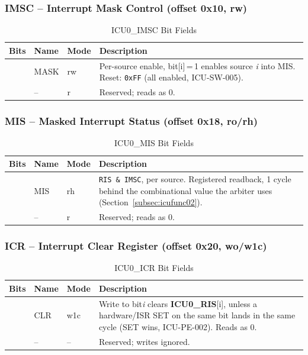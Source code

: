 \subsubsection{IMSC -- Interrupt Mask Control (offset 0x10, rw)}

\begin{table}[H]
\caption{ICU0\_IMSC Bit Fields}
\label{tab:asIcuIMSC}
\centering
\begin{tabularx}{\textwidth}{|l |l |l |X|}
  \hline
  Bits & Name & Mode & Description \\
  \hline
  \hline
  [7:0] & MASK & rw & Per-source enable, bit[i]\,=\,1 enables source \emph{i}
    into MIS. Reset: \texttt{0xFF} (all enabled, ICU-SW-005). \\
  \hline
  [63:8] & -- & r & Reserved; reads as 0. \\
  \hline
\end{tabularx}
\end{table}

\subsubsection{MIS -- Masked Interrupt Status (offset 0x18, ro/rh)}

\begin{table}[H]
\caption{ICU0\_MIS Bit Fields}
\label{tab:asIcuMIS}
\centering
\begin{tabularx}{\textwidth}{|l |l |l |X|}
  \hline
  Bits & Name & Mode & Description \\
  \hline
  \hline
  [7:0] & MIS & rh & \texttt{RIS\,\&\,IMSC}, per source. Registered
    readback, 1 cycle behind the combinational value the arbiter uses
    (Section~\ref{subsec:icufunc02}). \\
  \hline
  [63:8] & -- & r & Reserved; reads as 0. \\
  \hline
\end{tabularx}
\end{table}

\subsubsection{ICR -- Interrupt Clear Register (offset 0x20, wo/w1c)}

\begin{table}[H]
\caption{ICU0\_ICR Bit Fields}
\label{tab:asIcuICR}
\centering
\begin{tabularx}{\textwidth}{|l |l |l |X|}
  \hline
  Bits & Name & Mode & Description \\
  \hline
  \hline
  [7:0] & CLR & w1c & Write\;1 to bit\emph{i} clears \textbf{ICU0\_RIS}[i],
    unless a hardware/ISR SET on the same bit lands in the same cycle
    (SET wins, ICU-PE-002). Reads as 0. \\
  \hline
  [63:8] & -- & -- & Reserved; writes ignored. \\
  \hline
\end{tabularx}
\end{table}

